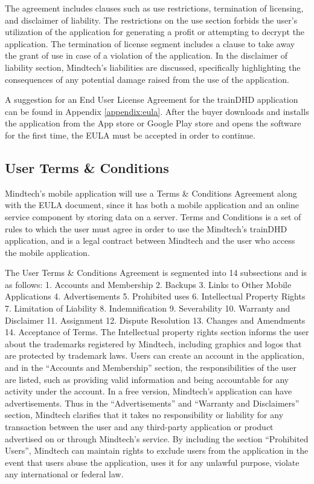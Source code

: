 \documentclass[letterpaper,10pt]{article}
\let\oldsubsection\subsection
\renewcommand{\subsection}{\def\cursectioning{subsection}\oldsubsection}
\begin{document}
The agreement includes clauses such as use restrictions, termination of licensing, and disclaimer of liability. The restrictions on the use section forbids the user’s utilization of the application for generating a profit or attempting to decrypt the application. The termination of license segment includes a clause to take away the grant of use in case of a violation of the application. In the disclaimer of liability section, Mindtech's liabilities are discussed, specifically highlighting the consequences of any potential damage raised from the use of the application. \cite{termsfeed_2016}
 
A suggestion for an End User License Agreement for the trainDHD application can be found in Appendix \ref{appendix:eula}.  After the buyer downloads and installs the application from the App store or Google Play store and opens the software for the first time, the EULA must be accepted in order to continue.
 


\subsection{User Terms \& Conditions}

Mindtech's mobile application will use a Terms \& Conditions Agreement along with the EULA document, since it has both a mobile application and an online service component by storing data on a server. Terms and Conditions is a set of rules to which the user must agree in order to use the Mindtech's trainDHD application, and is a legal contract between Mindtech and the user who access the mobile application. \cite{termsfeed_2017}

The User Terms \& Conditions Agreement is segmented into 14 subsections and is as follows: 1. Accounts and Membership 2. Backups 3. Links to Other Mobile Applications 4. Advertisements 5. Prohibited uses 6. Intellectual Property Rights 7. Limitation of Liability 8. Indemnification 9. Severability 10. Warranty and Disclaimer 11. Assignment 12. Dispute Resolution 13. Changes and Amendments 14. Acceptance of Terms. The Intellectual property rights section informs the user about the trademarks registered by Mindtech, including graphics and logos that are protected by trademark laws. Users can create an account in the application, and in the “Accounts and Membership” section, the responsibilities of the user are listed, such as providing valid information and being accountable for any activity under the account. In a free version, Mindtech's application can have advertisements. Thus in the “Advertisements” and “Warranty and Disclaimers” section, Mindtech clarifies that it takes no responsibility or liability for any transaction between the user and any third-party application or product advertised on or through Mindtech’s service. By including the section “Prohibited Users”, Mindtech can maintain rights to exclude users from the application in the event that users abuse the application, uses it for any unlawful purpose, violate any international or federal law.
\end{document}
